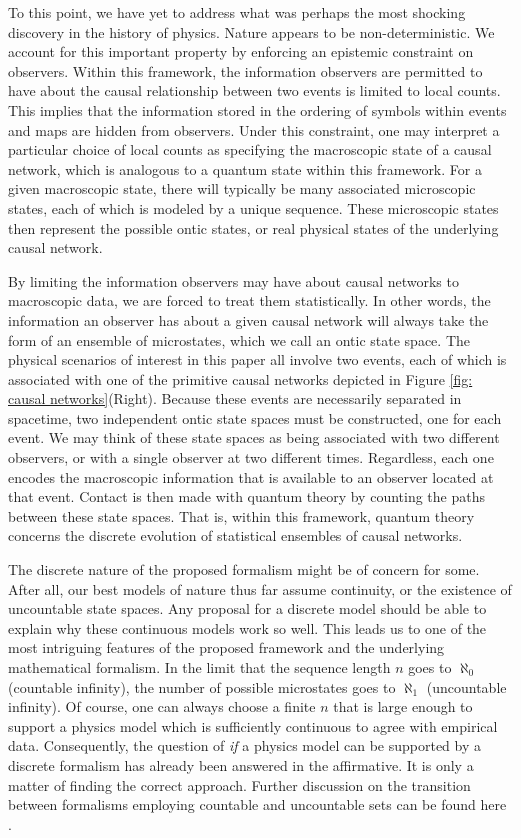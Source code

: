 \documentclass{article}
\begin{document}
To this point, we have yet to address what was perhaps the most shocking discovery in the history of physics. Nature appears to be non-deterministic. We account for this important property by enforcing an epistemic constraint on observers. Within this framework, the information observers are permitted to have about the causal relationship between two events is limited to local counts. This implies that the information stored in the ordering of symbols within events and maps are hidden from observers. Under this constraint, one may interpret a particular choice of local counts as specifying the macroscopic state of a causal network, which is analogous to a quantum state within this framework. For a given macroscopic state, there will typically be many associated microscopic states, each of which is modeled by a unique sequence. These microscopic states then represent the possible ontic states, or real physical states of the underlying causal network. 

By limiting the information observers may have about causal networks to macroscopic data, we are forced to treat them statistically. In other words, the information an observer has about a given causal network will always take the form of an ensemble of microstates, which we call an ontic state space. The physical scenarios of interest in this paper all involve two events, each of which is associated with one of the primitive causal networks depicted in Figure \ref{fig: causal networks}(Right). Because these events are necessarily separated in spacetime, two independent ontic state spaces must be constructed, one for each event.  We may think of these state spaces as being associated with two different observers, or with a single observer at two different times. Regardless, each one encodes the macroscopic information that is available to an observer located at that event. Contact is then made with quantum theory by counting the paths between these state spaces. That is, within this framework, quantum theory concerns the discrete evolution of statistical ensembles of causal networks. 

The discrete nature of the proposed formalism might be of concern for some. After all, our best models of nature thus far assume continuity, or the existence of uncountable state spaces. Any proposal for a discrete model should be able to explain why these continuous models work so well. This leads us to one of the most intriguing features of the proposed framework and the underlying mathematical formalism. In the limit that the sequence length $n$ goes to $\aleph_0$ (countable infinity), the number of possible microstates goes to $\aleph_1$ (uncountable infinity). Of course, one can always choose a finite $n$ that is large enough to support a physics model which is sufficiently continuous to agree with empirical data. Consequently, the question of \textit{if} a physics model can be supported by a discrete formalism has already been answered in the affirmative. It is only a matter of finding the correct approach. Further discussion on the transition between formalisms employing countable and uncountable sets can be found here \cite{Raptis2019_1, Levi2006, hietarinta2016}.
\end{document}
